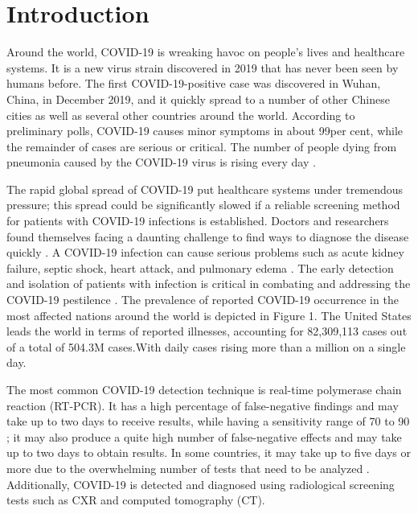 \documentclass[a4paper,12pt]{report}
\begin{document}
\chapter{Introduction}
Around the world, COVID-19 is wreaking havoc on people’s lives and healthcare
systems. It is a new virus strain discovered in 2019 that has never been seen by humans
before. The first COVID-19-positive case was discovered in Wuhan, China, in December
2019, and it quickly spread to a number of other Chinese cities as well as several other
countries around the world\cite{ref1,ref2}. According to preliminary polls, COVID-19 causes minor
symptoms in about 99per cent, while the remainder of cases are serious or critical. The number of
people dying from pneumonia caused by the COVID-19 virus is rising every day \cite{ref3}.

The rapid global spread of COVID-19 put healthcare systems under tremendous
pressure; this spread could be significantly slowed if a reliable screening method for patients
with COVID-19 infections is established. Doctors and researchers found themselves facing a
daunting challenge to find ways to diagnose the disease quickly \cite{ref4}. A COVID-19 infection
can cause serious problems such as acute kidney failure, septic shock, heart attack, and
pulmonary edema \cite{ref5}. The early detection and isolation of patients with infection is critical
in combating and addressing the COVID-19 pestilence \cite{ref6,ref9}. The prevalence of reported
COVID-19 occurrence in the most affected nations around the world is depicted in Figure 1.
The United States leads the world in terms of reported illnesses, accounting for 82,309,113
cases out of a total of 504.3M cases.With daily cases rising more than a million on a single day.

The most common COVID-19 detection technique is real-time polymerase chain
reaction (RT-PCR). It has a high percentage of false-negative findings and may take up
to two days to receive results, while having a sensitivity range of 70 to 90 \cite{ref9}; it may also
produce a quite high number of false-negative effects and may take up to two days to obtain
results. In some countries, it may take up to five days or more due to the overwhelming
number of tests that need to be analyzed \cite{ref4}.
Additionally, COVID-19 is detected and diagnosed using radiological screening tests
such as CXR and computed tomography (CT). 
\end{document}
